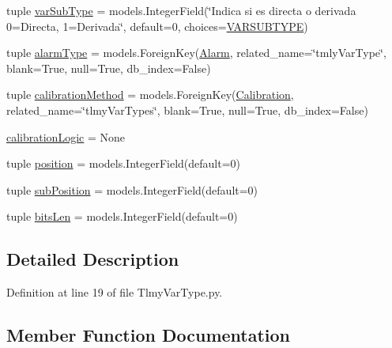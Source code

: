 \begin{DoxyCompactItemize}
\item 
tuple \hyperlink{class_ground_segment_1_1models_1_1_tlmy_var_type_1_1_tlmy_var_type_ad7c03c17c8743df66707b060faeb94a3}{var\+Sub\+Type} = models.\+Integer\+Field(\char`\"{}Indica si es directa o derivada 0=Directa, 1=Derivada\char`\"{}, default=0, choices=\hyperlink{class_ground_segment_1_1models_1_1_tlmy_var_type_1_1_tlmy_var_type_a4d07d8c0064f8f2d2edbfb5b53001d9b}{V\+A\+R\+S\+U\+B\+T\+Y\+P\+E})
\item 
tuple \hyperlink{class_ground_segment_1_1models_1_1_tlmy_var_type_1_1_tlmy_var_type_accecfd4f317d7866b48ebec1e60f5766}{alarm\+Type} = models.\+Foreign\+Key(\hyperlink{class_ground_segment_1_1models_1_1_alarm_1_1_alarm_1_1_alarm}{Alarm}, related\+\_\+name=\char`\"{}tmly\+Var\+Type\char`\"{}, blank=True, null=True, db\+\_\+index=False)
\item 
tuple \hyperlink{class_ground_segment_1_1models_1_1_tlmy_var_type_1_1_tlmy_var_type_aea6d325a3ab053c6ee06e71a6f06c7b6}{calibration\+Method} = models.\+Foreign\+Key(\hyperlink{class_ground_segment_1_1models_1_1_calibration_1_1_calibration}{Calibration}, related\+\_\+name=\char`\"{}tlmy\+Var\+Types\char`\"{}, blank=True, null=True, db\+\_\+index=False)
\item 
\hyperlink{class_ground_segment_1_1models_1_1_tlmy_var_type_1_1_tlmy_var_type_a18f6c92fda417c08ae8d76bafe2284be}{calibration\+Logic} = None
\item 
tuple \hyperlink{class_ground_segment_1_1models_1_1_tlmy_var_type_1_1_tlmy_var_type_aa3a596ef393485c1f9574fbafc151967}{position} = models.\+Integer\+Field(default=0)
\item 
tuple \hyperlink{class_ground_segment_1_1models_1_1_tlmy_var_type_1_1_tlmy_var_type_a5058fd500a0d206e5442dd8d6b5c038c}{sub\+Position} = models.\+Integer\+Field(default=0)
\item 
tuple \hyperlink{class_ground_segment_1_1models_1_1_tlmy_var_type_1_1_tlmy_var_type_a539a59fecef80aaa8d292ac5312f252a}{bits\+Len} = models.\+Integer\+Field(default=0)
\end{DoxyCompactItemize}


\subsection{Detailed Description}


Definition at line 19 of file Tlmy\+Var\+Type.\+py.



\subsection{Member Function Documentation}
\hypertarget{class_ground_segment_1_1models_1_1_tlmy_var_type_1_1_tlmy_var_type_ada8f03c46e8d44e5325d8b1e146761ce}{}
